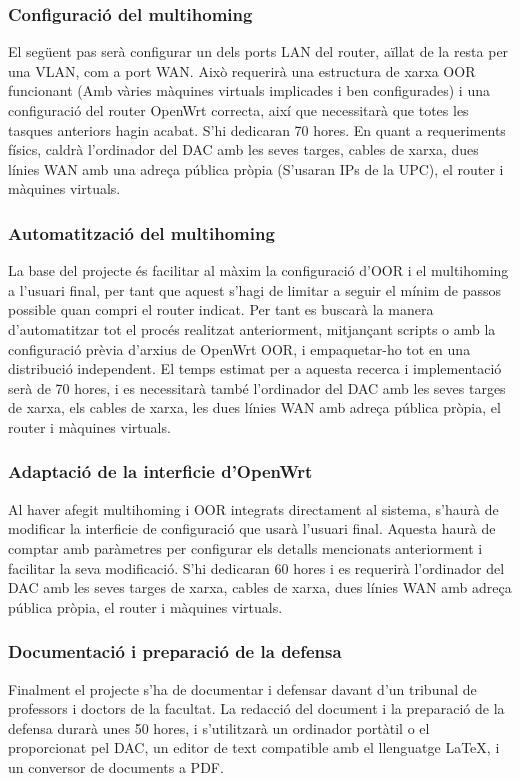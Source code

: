 \documentclass{article}
\begin{document}
\begin{enumerate}
\begin{enumerate}
\begin{enumerate}
\subsubsection{Configuració del multihoming}
El següent pas serà configurar un dels ports LAN del router, aïllat de la resta per una VLAN, com a port WAN. Això requerirà una estructura de xarxa OOR funcionant (Amb vàries màquines virtuals implicades i ben configurades) i una configuració del router OpenWrt  correcta, així que necessitarà que totes les tasques anteriors hagin acabat. S’hi dedicaran 70 hores. En quant a requeriments físics, caldrà l’ordinador del DAC amb les seves targes, cables de xarxa, dues línies WAN amb una adreça pública pròpia (S’usaran IPs de la UPC), el router i màquines virtuals.
\subsubsection{Automatització del multihoming}
La base del projecte és facilitar al màxim la configuració d’OOR i el multihoming a l’usuari final, per tant que aquest s’hagi de limitar a seguir el mínim de passos possible quan compri el router indicat. Per tant es buscarà la manera d’automatitzar tot el procés realitzat anteriorment, mitjançant scripts o amb la configuració prèvia d’arxius de OpenWrt OOR, i empaquetar-ho tot en una distribució independent. El temps estimat per a aquesta recerca i implementació serà de 70 hores, i es necessitarà també l’ordinador del DAC amb les seves targes de xarxa, els cables de xarxa, les dues línies WAN amb adreça pública pròpia, el router i màquines virtuals.
\subsubsection{Adaptació de la interficie d’OpenWrt}
Al haver afegit multihoming i OOR integrats directament al sistema, s’haurà de modificar la interficie de configuració que usarà l’usuari final. Aquesta haurà de comptar amb paràmetres per configurar els detalls mencionats anteriorment i facilitar la seva modificació. S’hi dedicaran 60 hores i es requerirà l’ordinador del DAC amb les seves targes de xarxa, cables de xarxa, dues línies WAN amb adreça pública pròpia, el router i màquines virtuals.
\subsubsection{Documentació i preparació de la defensa}
Finalment el projecte s’ha de documentar i defensar davant d’un tribunal de professors i doctors de la facultat. La redacció del document i la preparació de la defensa durarà unes 50 hores, i s’utilitzarà un ordinador portàtil o el proporcionat pel DAC, un editor de text compatible amb el llenguatge LaTeX, i un conversor de documents a PDF.


\end{enumerate}
\end{enumerate}
\end{enumerate}
\end{document}
